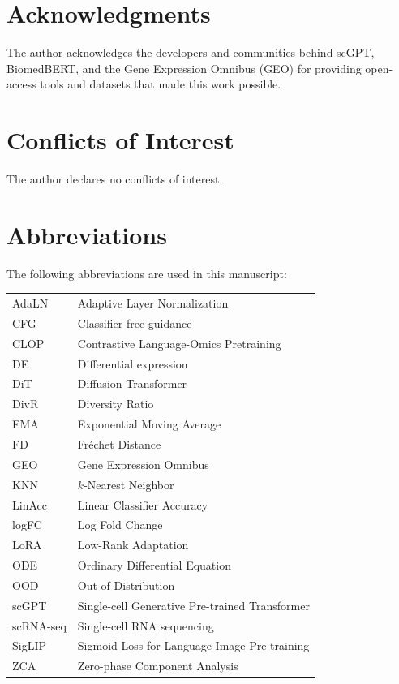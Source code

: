\documentclass[11pt,a4paper]{article}
\newcommand{\abbreviations}[2]{\section*{#1}#2}
\newcommand{\acknowledgments}[1]{\section*{Acknowledgments}#1}
\newcommand{\conflictsofinterest}[1]{\section*{Conflicts of Interest}#1}
\begin{document}
%
%

\acknowledgments{The author acknowledges the developers and communities behind scGPT, BiomedBERT, and the Gene Expression Omnibus (GEO) for providing open-access tools and datasets that made this work possible.}

\conflictsofinterest{The author declares no conflicts of interest.}



\abbreviations{Abbreviations}{
The following abbreviations are used in this manuscript:\\\noindent
\begin{tabular}{@{}ll}
AdaLN & Adaptive Layer Normalization\\
CFG & Classifier-free guidance\\
CLOP & Contrastive Language-Omics Pretraining\\
DE & Differential expression\\
DiT & Diffusion Transformer\\
DivR & Diversity Ratio\\
EMA & Exponential Moving Average\\
FD & Fr\'{e}chet Distance\\
GEO & Gene Expression Omnibus\\
KNN & $k$-Nearest Neighbor\\
LinAcc & Linear Classifier Accuracy\\
logFC & Log Fold Change\\
LoRA & Low-Rank Adaptation\\
ODE & Ordinary Differential Equation\\
OOD & Out-of-Distribution\\
scGPT & Single-cell Generative Pre-trained Transformer\\
scRNA-seq & Single-cell RNA sequencing\\
SigLIP & Sigmoid Loss for Language-Image Pre-training\\
ZCA & Zero-phase Component Analysis
\end{tabular}
}
\end{document}
